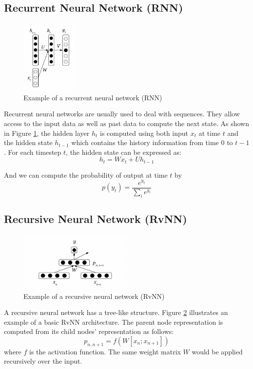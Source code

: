 \documentclass[12pt,a4paper,twoside,openright]{report}
\begin{document}
\subsection{Recurrent Neural Network (RNN)}
\begin{figure}[ht]
\centering
\includegraphics[width=0.25\textwidth]{images/rnn.png}
\caption{Example of a recurrent neural network (RNN)}
\label{fig:rnn}
\end{figure}
Recurrent neural networks are usually used to deal with sequences. They allow access to the input data as well as past data to compute the next state. As shown in Figure \ref{fig:rnn}, the hidden layer $h_t$ is computed using both input $x_t$ at time $t$ and the hidden state $h_{t-1}$ which contains the history information from time 0 to $t-1$. For each timestep $t$, the hidden state can be expressed as:
\[ h_t = Wx_t + Uh_{t-1} \]

And we can compute the probability of output at time $t$ by
\[ p(y_t) = \frac{e^{y_t}}{\sum_{i}e^{y_i}}\]


\subsection{Recursive Neural Network (RvNN)}
\begin{figure}[ht]
\centering
\includegraphics[width=0.5\textwidth]{images/rvnn.png}
\caption{Example of a recursive neural network (RvNN)}
\label{fig:rvnn}
\end{figure}
A recursive neural network has a tree-like structure. Figure \ref{fig:rvnn} illustrates an example of a basic RvNN architecture. The parent node representation is computed from its child nodes' representation as follows:
\[ p_{n, n+1} = f(W[x_n; x_{n+1}]) \]
where $f$ is the activation function. The same weight matrix $W$ would be applied recursively over the input.
\end{document}
